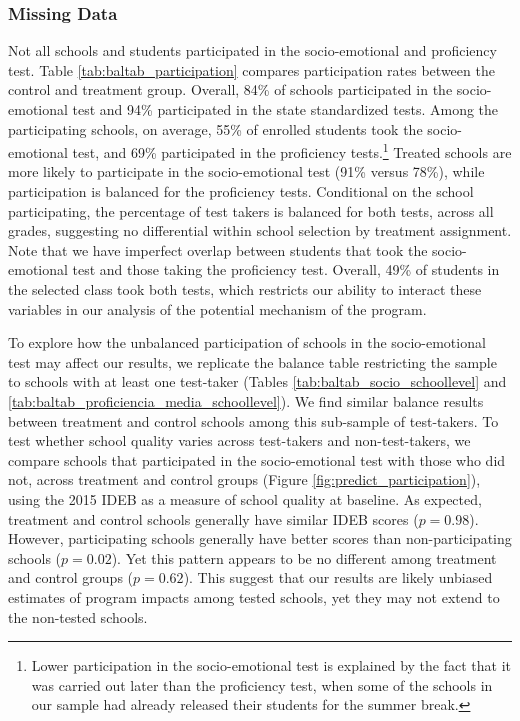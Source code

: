 \documentclass[11pt,a4paper]{article}
\begin{document}
\subsubsection*{Missing Data}
Not all schools and students participated in the socio-emotional and proficiency test. Table \ref{tab:baltab_participation} compares participation rates between the control and treatment group. Overall, 84\% of schools participated in the socio-emotional test and 94\% participated in the state standardized tests. Among the participating schools, on average, 55\% of enrolled students took the socio-emotional test, and 69\% participated in the proficiency tests.\footnote{Lower participation in the socio-emotional test is explained by the fact that it was carried out later than the proficiency test, when some of the schools in our sample had already released their students for the summer break.} Treated schools are more likely to participate in the socio-emotional test (91\% versus 78\%), while participation is balanced for the proficiency tests. Conditional on the school participating, the percentage of test takers is balanced for both tests, across all grades, suggesting no differential within school selection by treatment assignment. Note that we have imperfect overlap between students that took the socio-emotional test and those taking the proficiency test. Overall, 49\% of students in the selected class took both tests, which restricts our ability to interact these variables in our analysis of the potential mechanism of the program.

To explore how the unbalanced participation of schools in the socio-emotional test may affect our results, we replicate the balance table restricting the sample to schools with at least one test-taker (Tables \ref{tab:baltab_socio_schoollevel} and \ref{tab:baltab_proficiencia_media_schoollevel}). We find similar balance results between treatment and control schools among this sub-sample of test-takers. To test whether school quality varies across test-takers and non-test-takers, we compare schools that participated in the socio-emotional test with those who did not, across treatment and control groups (Figure \ref{fig:predict_participation}), using the 2015 IDEB as a measure of school quality at baseline. As expected, treatment and control schools generally have similar IDEB scores ($p=0.98$). However, participating schools generally have better scores than non-participating schools ($p=0.02$). Yet this pattern appears to be no different among treatment and control groups ($p=0.62$). This suggest that our results are likely unbiased estimates of program impacts among tested schools, yet they may not extend to the non-tested schools.
\end{document}
